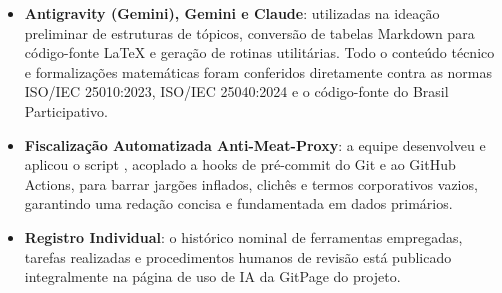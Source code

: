 \documentclass[journal]{IEEEtran}
\begin{document}
\begin{itemize}
    \item \textbf{Antigravity (Gemini), Gemini e Claude}: utilizadas na ideação preliminar de estruturas de tópicos, conversão de tabelas Markdown para código-fonte LaTeX e geração de rotinas utilitárias. Todo o conteúdo técnico e formalizações matemáticas foram conferidos diretamente contra as normas ISO/IEC 25010:2023, ISO/IEC 25040:2024 e o código-fonte do Brasil Participativo.
    \item \textbf{Fiscalização Automatizada Anti-Meat-Proxy}: a equipe desenvolveu e aplicou o script , acoplado a hooks de pré-commit do Git e ao GitHub Actions, para barrar jargões inflados, clichês e termos corporativos vazios, garantindo uma redação concisa e fundamentada em dados primários.
    \item \textbf{Registro Individual}: o histórico nominal de ferramentas empregadas, tarefas realizadas e procedimentos humanos de revisão está publicado integralmente na página de uso de IA da GitPage do projeto.
\end{itemize}
\end{document}
